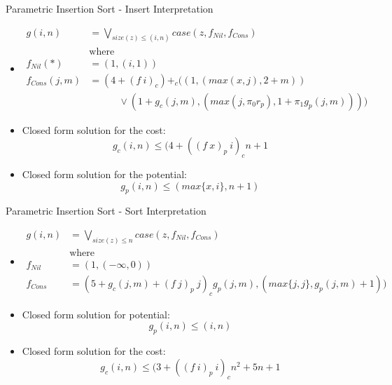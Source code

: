\documentclass[pdf]{beamer}
\newcommand{\quadthree}{\qquad\quad}
\begin{document}
\begin{frame}{Parametric Insertion Sort - Insert Interpretation}
  \begin{itemize}
    \item[]
      \small
      \begin{align*}
      g(i,n) &= \bigvee\limits_{size(z) \leq (i,n)} case(z, f_{Nil}, f_{Cons}) \\
             &\text{where}\\
      f_{Nil}(\ast) &= (1, (i, 1)) \\
      f_{Cons}(j,m) &= (4 + (f\ i)_c) +_c ((1, (max(x,j), 2 + m)) \\
                    &\quadthree \vee (1 + g_c(j,m), (max(j,\pi_0 r_p), 1 + \pi_1 g_p(j,m))))
      \end{align*}
    \item Closed form solution for the cost:
      \[g_c(i,n) \leq (4 + ((f\ x)_p\ i)_c n + 1\]
    \item Closed form solution for the potential:
      \[g_p(i,n) \leq (max\{x, i\}, n+1)\]
  \end{itemize}
\end{frame}

\begin{frame}{Parametric Insertion Sort - Sort Interpretation}
  \begin{itemize}
    \item[]
      \small
      \begin{align*}
      g(i, n) &= \bigvee\limits_{size(z)\leq n} case(z, f_{Nil}, f_{Cons}) \\
              &\text{where}\\
      f_{Nil} &= (1, (-\infty,0)) \\
    f_{Cons} &= (5 + g_c(j,m) + (f\ j)_p\ j)_c g_p(j,m), (max\{j,j\},g_p(j,m) + 1))
      \end{align*}
    \item Closed form solution for potential:
      \[g_p(i,n) \leq (i, n)\]
    \item Closed form solution for the cost:
      \[g_c(i,n) \leq (3 + ((f\ i)_p\ i)_c n^2 + 5n + 1\]
  \end{itemize}
\end{frame}
\end{document}
